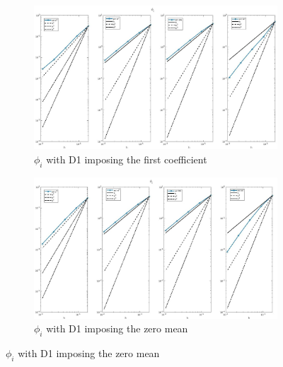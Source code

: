 \documentclass[a4paper,11pt]{article}
\begin{document}
\begin{figure}[H]
\caption{Comparison of the intracellular potential ($\phi_i$)}
\label{phii-unique}
\begin{subfigure}{\textwidth}
\begin{center}
\includegraphics[width = \textwidth]{./D1_Phii_1.jpg}
\caption{$\phi_i$ with D1 imposing the first coefficient}
\end{center}
\end{subfigure}
\begin{subfigure}{\textwidth}	
\begin{center}
\includegraphics[width =\textwidth]{./D1_Phii_2.jpg}
\caption{$\phi_i$ with D1 imposing the zero mean}
\end{center}
\end{subfigure}
\end{figure}
\newpage
\end{document}
